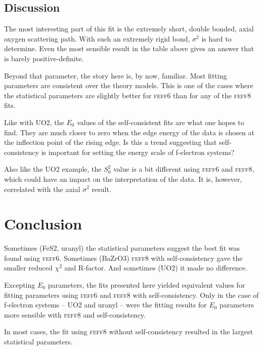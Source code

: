\documentclass[11pt]{article}
\begin{document}
\subsection{Discussion}
\label{sec:orgheadline42}

The most interesting part of this fit is the extremely short, double
bonded, axial oxygen scattering path. With such an extremely rigid bond,
$\sigma^2$ is hard to determine. Even the most sensible result in the table
above gives an answer that is barely positive-definite.

Beyond that parameter, the story here is, by now, familiar. Most fitting
parameters are consistent over the theory models. This is one of the
cases where the statistical parameters are slightly better for \textsc{feff6}
than for any of the \textsc{feff8} fits.

Like with UO2, the $E_0$ values of the self-consistent fits are what one
hopes to find. They are much closer to zero when the edge energy of the
data is chosen at the inflection point of the rising edge. Is this a
trend suggesting that self-consistency is important for setting the
energy scale of f-electron systems?

Also like the UO2 example, the $S_0^2$ value is a bit different using
\textsc{feff6} and \textsc{feff8}, which could have an impact on the interpretation of
the data. It is, however, correlated with the axial $\sigma^2$ result.


\section{Conclusion}
\label{sec:orgheadline47}

Sometimes (FeS2, uranyl) the statistical parameters suggest the best
fit was found using \textsc{feff6}. Sometimes (BaZrO3) \textsc{feff8}
with self-consistency gave the smaller reduced $\chi^2$ and
R-factor. And sometimes (UO2) it made no difference.

Excepting $E_0$ parameters, the fits presented here yielded equivalent
values for fitting parameters using \textsc{feff6} and \textsc{feff8}
with self-consistency. Only in the case of f-electron systems -- UO2
and uranyl -- were the fitting results for $E_0$ parameters more sensible
with \textsc{feff8} and self-consistency.

In most cases, the fit using \textsc{feff8} without self-consistency
resulted in the largest statistical parameters.
\end{document}
